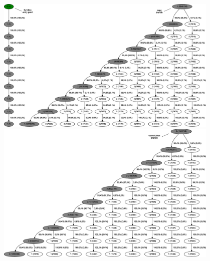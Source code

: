 \ifdefined\noauthorea
\begin{figure}[!t]
\centerline{\includegraphics[width=0.95\textwidth]{figures/CS-kipf-indiana/CS-kipf-indiana-top.eps}}
\vspace{6mm}
\centerline{\includegraphics[width=0.95\textwidth]{figures/CS-kipf-indiana/CS-kipf-indiana-bottom.eps}}
\caption{\protect}
\end{figure}
\fi

